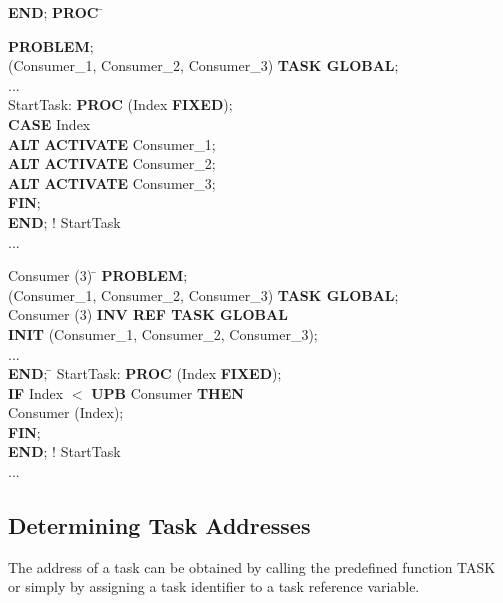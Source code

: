 \begin{tabbing}
 \= {\bf END}; \= {\bf PROC} \= \kill

{\bf PROBLEM}; \> \> \\
 (Consumer\_1, Consumer\_2, Consumer\_3) {\bf TASK GLOBAL}; \> \> \> \\
\x ... \> \> \> \\
\x StartTask: \> \> {\bf PROC} \> (Index {\bf FIXED});\\
       \> \> {\bf CASE} \> Index \\
       \> \> {\bf ALT}  \> {\bf ACTIVATE} Consumer\_1;\\
       \> \> {\bf ALT}  \> {\bf ACTIVATE} Consumer\_2; \\
       \> \> {\bf ALT}  \> {\bf ACTIVATE} Consumer\_3; \\
       \> \> {\bf FIN}; \> \\
\x \> {\bf END}; \> ! StartTask \> \\
\x ... \> \> \>
\end{tabbing}

\begin{tabbing}
 Consumer (3) \= \kill
{\bf PROBLEM}; \>  \\
 (Consumer\_1, Consumer\_2, Consumer\_3) {\bf TASK GLOBAL}; \> \\
 Consumer (3) \> {\bf INV REF TASK GLOBAL} \\
     \> {\bf INIT} (Consumer\_1, Consumer\_2, Consumer\_3);\\
\x ... \> \\
 \= {\bf END}; \= \kill
\x StartTask: \> \> {\bf PROC} (Index {\bf FIXED});\\
       \> \> {\bf IF} Index $<$ {\bf UPB} Consumer {\bf THEN}\\
       \> \>  Consumer (Index);\\
       \> \> {\bf FIN};\\
\x \> {\bf END}; \> ! StartTask\\

\x ... \> \>
\end{tabbing}

\subsection{Determining Task Addresses}  %

The address of a task can be obtained by calling the predefined
function TASK or simply by assigning a task identifier to a task
reference variable.

